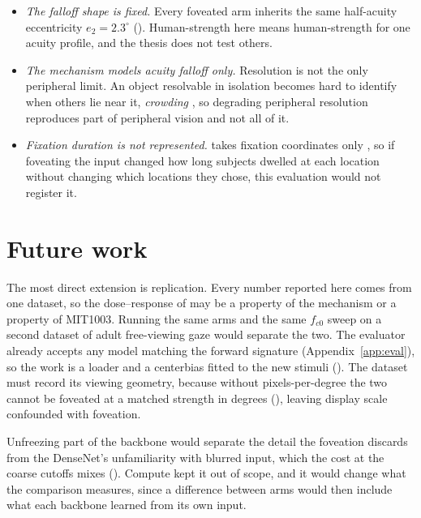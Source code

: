 \begin{itemize}
    given only as that range, while first language and script direction are not recorded at all, so
    none of them can be controlled for.
  \item \emph{The falloff shape is fixed.} Every foveated arm inherits the same half-acuity eccentricity
    $e_2 = 2.3^\circ$ (). Human-strength here means human-strength for
    one acuity profile, and the thesis does not test others.
  \item \emph{The mechanism models acuity falloff only.} Resolution is not the only peripheral limit. An
    object resolvable in isolation becomes hard to identify when others lie near it, \emph{crowding}
    \citep{strasburger2011peripheral}, so degrading peripheral resolution reproduces part of peripheral
    vision and not all of it.
  \item \emph{Fixation duration is not represented.} \dg{} takes fixation coordinates only
    \citep{kummerer2022deepgaze3}, so if foveating the input changed how long subjects dwelled at each
    location without changing which locations they chose, this evaluation would not register it.
\end{itemize}

\section{Future work}
\label{sec:disc-future}

The most direct extension is replication. Every number reported here comes from one dataset, so the
dose--response of  may be a property of the mechanism or a property of MIT1003.
Running the same arms and the same $f_{c0}$ sweep on a second dataset of adult free-viewing gaze would
separate the two. The evaluator already accepts any model matching the \dg{} forward signature
(Appendix~\ref{app:eval}), so the work is a loader and a centerbias fitted to the new stimuli
(). The dataset must record its viewing geometry, because without pixels-per-degree
the two cannot be foveated at a matched strength in degrees (), leaving display
scale confounded with foveation.

Unfreezing part of the backbone would separate the detail the foveation discards from the DenseNet's
unfamiliarity with blurred input, which the cost at the coarse cutoffs mixes ().
Compute kept it out of scope, and it would change what the comparison measures, since a difference
between arms would then include what each backbone learned from its own input.

